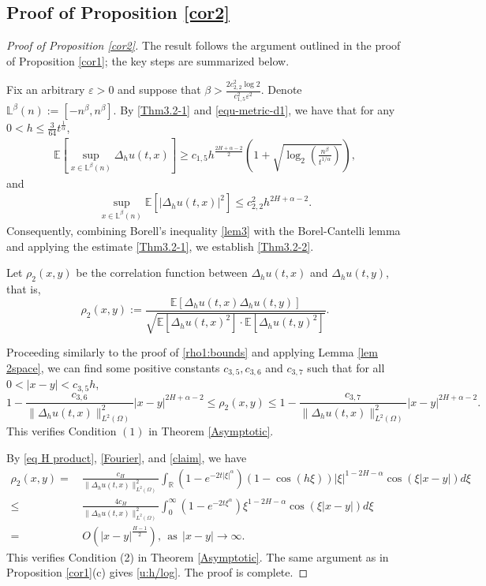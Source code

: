 \documentclass[11pt,reqno]{amsart}
\numberwithin{equation}{section}
\def\RR{\mathbb{R}}
\def\EE{\mathbb{E}}
\def\bL{\mathbb{L}}
\newcommand{\1}{{\bf 1}}
\newcommand{\2}{{\bf 2}}
\newcommand{\lc}{\left(}
\newcommand{\rc}{\right)}
\begin{document}
\subsection{Proof of  Proposition \ref{cor2}}
\begin{proof}[Proof of  Proposition \ref{cor2}] 
  The result follows the argument outlined in the proof of Proposition \ref{cor1}; the key steps are summarized below. 
  
Fix an arbitrary $\varepsilon>0$ and  suppose that   $\beta>\frac{2c_{2,2}^2\log 2 }{c_{1,5}^2\varepsilon^2}$. Denote
  $\bL^\beta(n) :=\left[-n^\beta,n^\beta\right]$.
By \eqref{Thm3.2-1} and \eqref{equ-metric-d1},
we have that for any $0<h\leq \frac3{64}t^{\frac{1}{\alpha}}$,
\begin{align*}
\EE\left[\sup_{x\in\bL^\beta(n)}\Delta_hu(t,x)\right]
\geq c_{1,5}h^{\frac{2H+\alpha-2}{2}}\lc 1+\sqrt{\log_2\lc\frac{n^\beta}{t^{1/\alpha}}\rc}\rc,
\end{align*}
and
\begin{align*}
     \sup_{x\in\bL^\beta(n)}\EE\left[|\Delta_hu (t,x)|^2\right]
     \leq c_{2,2}^2 h^{2H+\alpha-2}.
\end{align*}
Consequently,  combining Borell's inequality \eqref{lem3} with the Borel-Cantelli lemma and applying the estimate \eqref{Thm3.2-1}, we establish \eqref{Thm3.2-2}.

  Let $\rho_2(x,y)$ be  the correlation function   between $\Delta_h u(t,x)$ and $\Delta_h u(t,y)$, that is,
 $$\rho_2(x,y):=\frac{\mathbb E[\Delta_h u(t,x) \Delta_h u(t,y)]}{ \sqrt{\mathbb E[\Delta_h u(t,x)^2] \cdot \mathbb E[\Delta_h u(t,y)^2] }}.$$


Proceeding similarly to the proof of \eqref{rho1:bounds} and applying Lemma \ref{lem 2space}, we can find some positive constants $c_{3,5}, c_{3,6}$ and $c_{3,7}$ such that  for all $0<|x-y|<c_{3,5}h$,
 \begin{equation*}
1-\frac{c_{3,6}}{\|\Delta_hu(t,x)\|_{L^2(\Omega)}^2}|x-y|^{2H+\alpha-2}
\leq \rho_2(x,y)\leq
1-\frac{c_{3,7}}{\|\Delta_hu(t,x)\|_{L^2(\Omega)}^2}|x-y|^{2H+\alpha-2}.
\end{equation*}
 This verifies Condition $(1)$ in Theorem \ref{Asymptotic}.

By \eqref{eq H product}, \eqref{Fourier}, and \eqref{claim}, we have
 \begin{equation*}
 \begin{split}
\rho_2(x,y)
=&\, \frac{c_{H}}{\|\Delta_hu(t,x)\|_{L^2(\Omega)}^2}
\int_{\RR}\left( 1-e^{-2t|\xi|^\alpha}\right)
\left(1-\cos(h\xi)\right)|\xi|^{1-2H-\alpha}\cos(\xi|x-y|)d\xi \\
\leq&\, \frac{4c_{H}}{\|\Delta_hu(t,x)\|_{L^2(\Omega)}^2}
\int_{0}^\infty\left( 1-e^{-2t\xi^\alpha}\right)\xi^{1-2H-\alpha}\cos(\xi|x-y|)d\xi \\
=&\, O\left(|x-y|^{\frac{H-1}{2}}\right),\ \ \text{as}\ \ |x-y|\rightarrow\infty.
\end{split}
\end{equation*}
This verifies Condition (2) in Theorem \ref{Asymptotic}. The same argument as in  Proposition \ref{cor1}(c)   gives \eqref{u:h/log}. The proof is complete.
\end{proof}
\end{document}
